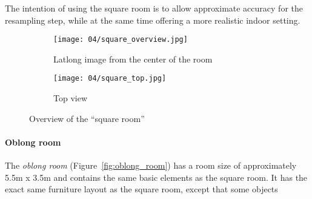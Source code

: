 The intention of using the square room is to allow approximate accuracy for the resampling step, while at the same time offering a more realistic indoor setting.

\begin{figure}
\centering
    \hfill
    \begin{subfigure}[b]{0.7\textwidth}
            \centering
            \texttt{[image: 04/square\_overview.jpg]}
            \caption{Latlong image from the center of the room}
    \end{subfigure}%
    \hfill
    \begin{subfigure}[b]{0.3\textwidth}
            \centering
            \texttt{[image: 04/square\_top.jpg]}
            \caption{Top view}
    \end{subfigure}
    \hfill
  \caption{Overview of the ``square room''}
  \label{fig:square_room}
\end{figure}

\paragraph{Oblong room}
The \emph{oblong room} (Figure~\ref{fig:oblong_room}) has a room size of approximately 5.5m x 3.5m and contains the same basic elements as the square room. It has the exact same furniture layout as the square room, except that some objects 


